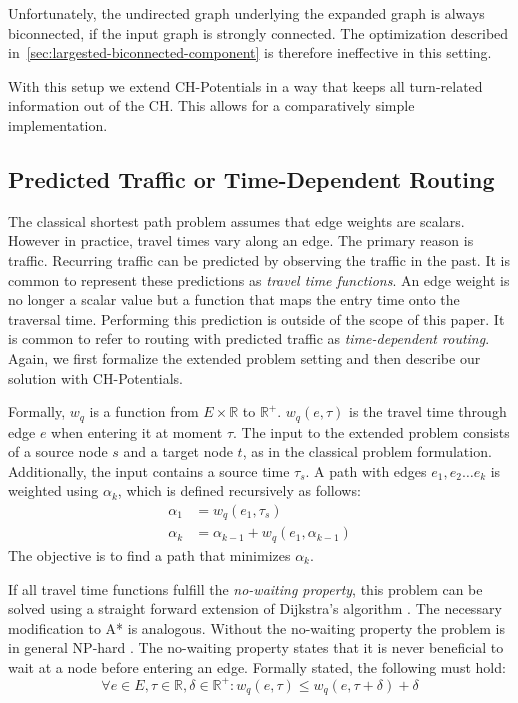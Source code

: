 \documentclass[letterpaper]{article} %
\begin{document}
Unfortunately, the undirected graph underlying the expanded graph is always biconnected, if the input graph is strongly connected.
The optimization described in~\ref{sec:largested-biconnected-component} is therefore ineffective in this setting.

With this setup we extend CH-Potentials in a way that keeps all turn-related information out of the CH.
This allows for a comparatively simple implementation.

\subsection{Predicted Traffic or Time-Dependent Routing}
\label{sec:predicted-traffic}

The classical shortest path problem assumes that edge weights are scalars.
However in practice, travel times vary along an edge.
The primary reason is traffic.
Recurring traffic can be predicted by observing the traffic in the past.
It is common \cite{bgsv-mtdtt-13,bdpw-dtdrp-16,swz-sfert-19} to represent these predictions as \emph{travel time functions}.
An edge weight is no longer a scalar value but a function that maps the entry time onto the traversal time.
Performing this prediction is outside of the scope of this paper.
It is common to refer to routing with predicted traffic as \emph{time-dependent routing}.
Again, we first formalize the extended problem setting and then describe our solution with CH-Potentials.

Formally, $w_q$ is a function from $E\times \mathbb{R}$ to $\mathbb{R}^+$.
$w_q(e, \tau)$ is the travel time through edge $e$ when entering it at moment $\tau$.
The input to the extended problem consists of a source node $s$ and a target node $t$, as in the classical problem formulation.
Additionally, the input contains a source time $\tau_s$.
A path with edges $e_1,e_2\ldots e_k$ is weighted using $\alpha_k$, which is defined recursively as follows:\[
\begin{split}
\alpha_{1} & = w_q(e_1, \tau_s) \\
\alpha_{k} & = \alpha_{k-1} + w_q(e_1, \alpha_{k-1})
\end{split}
\]
The objective is to find a path that minimizes $\alpha_k$.

If all travel time functions fulfill the \emph{no-waiting property}, this problem can be solved using a straight forward extension of Dijkstra's algorithm \cite{d-aassp-69}.
The necessary modification to A* is analogous.
Without the no-waiting property the problem is in general NP-hard \cite{or-tnp-89}.
The no-waiting property states that it is never beneficial to wait at a node before entering an edge.
Formally stated, the following must hold:\[
\forall e\in E,\tau\in \mathbb{R},\delta\in \mathbb{R}^+: w_q(e, \tau) \le w_q(e, \tau+\delta) + \delta
\]
\end{document}
